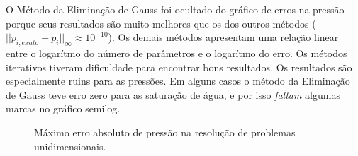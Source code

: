 \documentclass[final,5p]{elsarticle}
\numberwithin{equation}{section}
\begin{document}
        O Método da Eliminação de Gauss foi ocultado do gráfico de erros na pressão porque seus resultados são muito melhores que os dos outros métodos ($||p_{i,exato}-p_i||_\infty \approx 10^{-10}$). Os demais métodos apresentam uma relação linear entre o logarítmo do número de parâmetros e o logarítmo do erro. Os métodos iterativos tiveram dificuldade para encontrar bons resultados. Os resultados são especialmente ruins para as pressões. Em alguns casos o método da Eliminação de Gauss teve erro zero para as saturação de água, e por isso \emph{faltam} algumas marcas no gráfico semilog.

        \begin{figure}[hbt!]
            \caption{Máximo erro absoluto de pressão na resolução de problemas unidimensionais.}
            \label{fig:erropressao10k}
        \end{figure}
\end{document}

